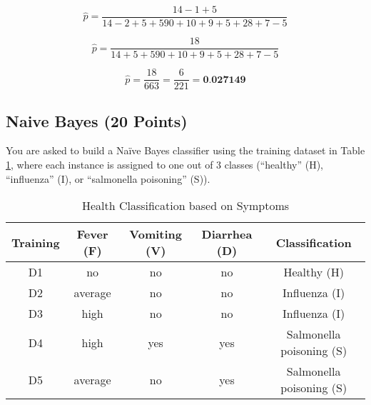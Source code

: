 \documentclass[a3paper,12pt]{article} %
\begin{document}
\begin{enumerate}
\[
\hat{p} = \frac{14 - 1 + 5}{14 - 2 + 5 + 590 + 10 + 9 + 5 + 28 + 7 - 5}
\]

\[
\hat{p} = \frac{18}{14 + 5 + 590 + 10 + 9 + 5 + 28 + 7 - 5}
\]

\[
\hat{p} = \frac{18}{663} = \frac{6}{221} = \textbf{0.027149}
\]

\end{enumerate}

\subsection{Naive Bayes (20 Points)}
You are asked to build a Na\"ive Bayes classifier using the training dataset in Table \ref{tab:training_data}, where each instance is assigned to one out of 3 classes (“healthy” (H), “influenza” (I), or “salmonella poisoning” (S)).

\begin{table}[h]
\centering
\begin{tabular}{|c|c|c|c|c|}
\hline
Training &Fever (F) & Vomiting (V) & Diarrhea (D) & Classification \\
\hline
D1 & no & no & no & Healthy (H) \\
D2 & average & no & no & Influenza (I) \\
D3 & high & no & no & Influenza (I) \\
D4 & high & yes & yes & Salmonella poisoning (S) \\
D5 & average & no & yes & Salmonella poisoning (S) \\
\hline
\end{tabular}
\caption{Health Classification based on Symptoms}
\label{tab:training_data}
\end{table}
\end{document}
